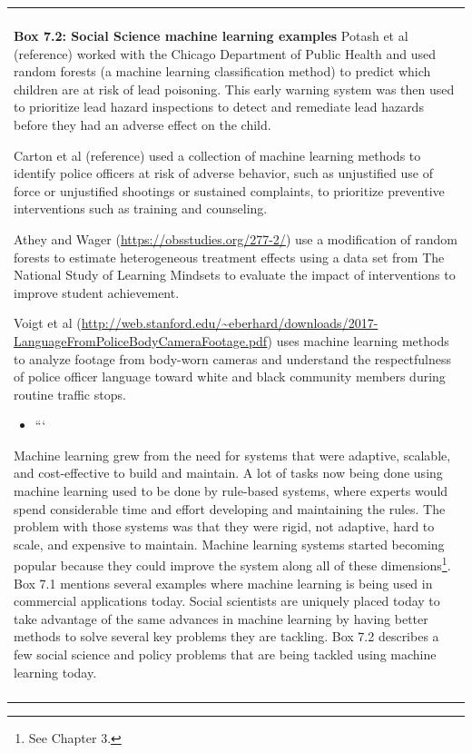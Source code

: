 \documentclass[]{krantz}
\providecommand{\tightlist}{%
  \setlength{\itemsep}{0pt}\setlength{\parskip}{0pt}}
\newenvironment{F00}
    {\begin{center}
    \begin{tabular}{|p{0.9\textwidth}|}
    \hline\\
    }
    { 
    \\\\\hline
    \end{tabular} 
    \end{center}
    }
\begin{document}
\enlargethispage{6pt}

\begin{F00}
\textbf{Box 7.2: Social Science machine learning examples} Potash et al
(reference) worked with the Chicago Department of Public Health and used
random forests (a machine learning classification method) to predict
which children are at risk of lead poisoning. This early warning system
was then used to prioritize lead hazard inspections to detect and
remediate lead hazards before they had an adverse effect on the child.

Carton et al (reference) used a collection of machine learning methods
to identify police officers at risk of adverse behavior, such as
unjustified use of force or unjustified shootings or sustained
complaints, to prioritize preventive interventions such as training and
counseling.

Athey and Wager (\url{https://obsstudies.org/277-2/}) use a modification
of random forests to estimate heterogeneous treatment effects using a
data set from The National Study of Learning Mindsets to evaluate the
impact of interventions to improve student achievement.

Voigt et al
(\url{http://web.stanford.edu/~eberhard/downloads/2017-LanguageFromPoliceBodyCameraFootage.pdf})
uses machine learning methods to analyze footage from body-worn cameras
and understand the respectfulness of police officer language toward
white and black community members during routine traffic stops.

\begin{itemize}
\tightlist
\item
  ```
\end{itemize}

Machine learning grew from the need for systems that were adaptive,
scalable, and cost-effective to build and maintain. A lot of tasks now
being done using machine learning used to be done by rule-based systems,
where experts would spend considerable time and effort developing and
maintaining the rules. The problem with those systems was that they were
rigid, not adaptive, hard to scale, and expensive to maintain. Machine
learning systems started becoming popular because they could improve the
system along all of these dimensions\footnote{See Chapter 3.}. Box 7.1
mentions several examples where machine learning is being used in
commercial applications today. Social scientists are uniquely placed
today to take advantage of the same advances in machine learning by
having better methods to solve several key problems they are tackling.
Box 7.2 describes a few social science and policy problems that are
being tackled using machine learning today.


\end{F00}
\end{document}
